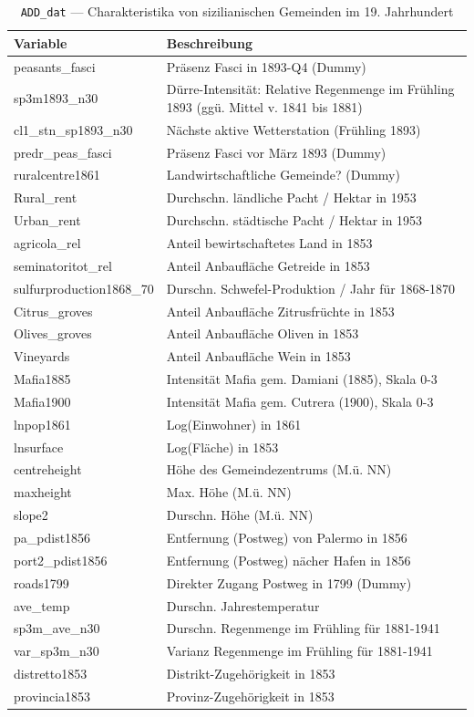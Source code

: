 \documentclass[
  a4paper,
  DIV=11,
  oneside]{scrreprt}
\begin{document}
\begin{longtable}{@{\extracolsep{\fill}}ll}

\caption{\label{tbl-ADD_dat}\texttt{ADD\_dat} --- Charakteristika von
sizilianischen Gemeinden im 19. Jahrhundert}

\tabularnewline

\toprule
Variable & Beschreibung \\ 
\midrule\addlinespace[2.5pt]
peasants\_fasci & Präsenz Fasci in 1893-Q4 (Dummy) \\ 
sp3m1893\_n30 & Dürre-Intensität: Relative Regenmenge im Frühling 1893 (ggü. Mittel v. 1841 bis 1881)  \\ 
cl1\_stn\_sp1893\_n30 & Nächste aktive Wetterstation (Frühling 1893) \\ 
predr\_peas\_fasci & Präsenz Fasci vor März 1893 (Dummy) \\ 
ruralcentre1861 & Landwirtschaftliche Gemeinde? (Dummy) \\ 
Rural\_rent & Durchschn. ländliche Pacht / Hektar in 1953 \\ 
Urban\_rent & Durchschn. städtische Pacht / Hektar in 1953 \\ 
agricola\_rel & Anteil bewirtschaftetes Land in 1853 \\ 
seminatoritot\_rel & Anteil Anbaufläche Getreide in 1853 \\ 
sulfurproduction1868\_70 & Durschn. Schwefel-Produktion / Jahr für 1868-1870 \\ 
Citrus\_groves & Anteil Anbaufläche Zitrusfrüchte in 1853 \\ 
Olives\_groves & Anteil Anbaufläche Oliven in 1853 \\ 
Vineyards & Anteil Anbaufläche Wein in 1853 \\ 
Mafia1885 & Intensität Mafia gem. Damiani (1885), Skala 0-3 \\ 
Mafia1900 & Intensität Mafia gem. Cutrera (1900), Skala 0-3 \\ 
lnpop1861 & Log(Einwohner) in 1861 \\ 
lnsurface & Log(Fläche) in 1853 \\ 
centreheight & Höhe des Gemeindezentrums (M.ü. NN) \\ 
maxheight & Max. Höhe (M.ü. NN) \\ 
slope2 & Durschn. Höhe (M.ü. NN) \\ 
pa\_pdist1856 & Entfernung (Postweg) von Palermo in 1856 \\ 
port2\_pdist1856 & Entfernung (Postweg) nächer Hafen in 1856 \\ 
roads1799 & Direkter Zugang Postweg in 1799 (Dummy) \\ 
ave\_temp & Durschn. Jahrestemperatur \\ 
sp3m\_ave\_n30 & Durschn. Regenmenge im Frühling für 1881-1941 \\ 
var\_sp3m\_n30 & Varianz Regenmenge im Frühling für 1881-1941 \\ 
distretto1853 & Distrikt-Zugehörigkeit in 1853 \\ 
provincia1853 & Provinz-Zugehörigkeit in 1853 \\ 
\bottomrule

\end{longtable}
\end{document}
